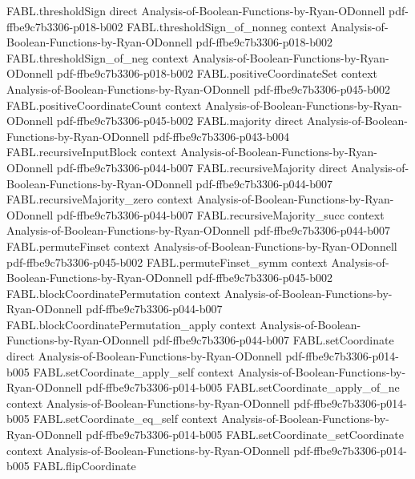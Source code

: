 \begin{theorem}
\proofstep
  {FABL.thresholdSign}
  {direct}
  {Analysis-of-Boolean-Functions-by-Ryan-ODonnell}
  {pdf-ffbe9c7b3306-p018-b002}
\proofstep
  {FABL.thresholdSign_of_nonneg}
  {context}
  {Analysis-of-Boolean-Functions-by-Ryan-ODonnell}
  {pdf-ffbe9c7b3306-p018-b002}
\proofstep
  {FABL.thresholdSign_of_neg}
  {context}
  {Analysis-of-Boolean-Functions-by-Ryan-ODonnell}
  {pdf-ffbe9c7b3306-p018-b002}
\proofstep
  {FABL.positiveCoordinateSet}
  {context}
  {Analysis-of-Boolean-Functions-by-Ryan-ODonnell}
  {pdf-ffbe9c7b3306-p045-b002}
\proofstep
  {FABL.positiveCoordinateCount}
  {context}
  {Analysis-of-Boolean-Functions-by-Ryan-ODonnell}
  {pdf-ffbe9c7b3306-p045-b002}
\proofstep
  {FABL.majority}
  {direct}
  {Analysis-of-Boolean-Functions-by-Ryan-ODonnell}
  {pdf-ffbe9c7b3306-p043-b004}
\proofstep
  {FABL.recursiveInputBlock}
  {context}
  {Analysis-of-Boolean-Functions-by-Ryan-ODonnell}
  {pdf-ffbe9c7b3306-p044-b007}
\proofstep
  {FABL.recursiveMajority}
  {direct}
  {Analysis-of-Boolean-Functions-by-Ryan-ODonnell}
  {pdf-ffbe9c7b3306-p044-b007}
\proofstep
  {FABL.recursiveMajority_zero}
  {context}
  {Analysis-of-Boolean-Functions-by-Ryan-ODonnell}
  {pdf-ffbe9c7b3306-p044-b007}
\proofstep
  {FABL.recursiveMajority_succ}
  {context}
  {Analysis-of-Boolean-Functions-by-Ryan-ODonnell}
  {pdf-ffbe9c7b3306-p044-b007}
\proofstep
  {FABL.permuteFinset}
  {context}
  {Analysis-of-Boolean-Functions-by-Ryan-ODonnell}
  {pdf-ffbe9c7b3306-p045-b002}
\proofstep
  {FABL.permuteFinset_symm}
  {context}
  {Analysis-of-Boolean-Functions-by-Ryan-ODonnell}
  {pdf-ffbe9c7b3306-p045-b002}
\proofstep
  {FABL.blockCoordinatePermutation}
  {context}
  {Analysis-of-Boolean-Functions-by-Ryan-ODonnell}
  {pdf-ffbe9c7b3306-p044-b007}
\proofstep
  {FABL.blockCoordinatePermutation_apply}
  {context}
  {Analysis-of-Boolean-Functions-by-Ryan-ODonnell}
  {pdf-ffbe9c7b3306-p044-b007}
\proofstep
  {FABL.setCoordinate}
  {direct}
  {Analysis-of-Boolean-Functions-by-Ryan-ODonnell}
  {pdf-ffbe9c7b3306-p014-b005}
\proofstep
  {FABL.setCoordinate_apply_self}
  {context}
  {Analysis-of-Boolean-Functions-by-Ryan-ODonnell}
  {pdf-ffbe9c7b3306-p014-b005}
\proofstep
  {FABL.setCoordinate_apply_of_ne}
  {context}
  {Analysis-of-Boolean-Functions-by-Ryan-ODonnell}
  {pdf-ffbe9c7b3306-p014-b005}
\proofstep
  {FABL.setCoordinate_eq_self}
  {context}
  {Analysis-of-Boolean-Functions-by-Ryan-ODonnell}
  {pdf-ffbe9c7b3306-p014-b005}
\proofstep
  {FABL.setCoordinate_setCoordinate}
  {context}
  {Analysis-of-Boolean-Functions-by-Ryan-ODonnell}
  {pdf-ffbe9c7b3306-p014-b005}
\proofstep
  {FABL.flipCoordinate}

\end{theorem}
